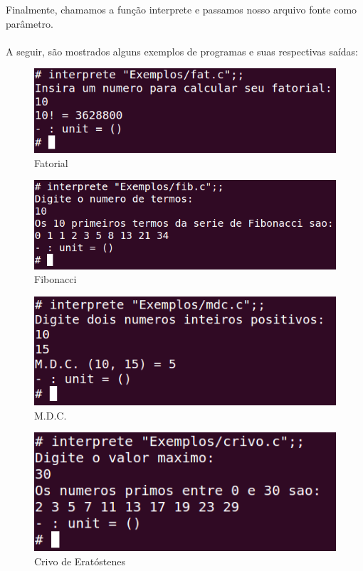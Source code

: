 \documentclass[12pt,a4paper,twoside]{report}
\begin{document}
Finalmente, chamamos a função interprete e passamos nosso arquivo fonte como parâmetro.\\\\

A seguir, são mostrados alguns exemplos de programas e suas respectivas saídas:

\begin{figure}[!h]
\centering
\caption{Fatorial} \label{fig:fatorial}
\includegraphics[scale=0.5]{imagens/fat.png}
\end{figure}

\begin{figure}[!h]
\centering
\caption{Fibonacci} \label{fig:fibonacci}
\includegraphics[scale=0.5]{imagens/fib.png}
\end{figure}

\begin{figure}[!h]
\centering
\caption{M.D.C.} \label{fig:mdc}
\includegraphics[scale=0.5]{imagens/mdc.png}
\end{figure}

\begin{figure}[!h]
\centering
\caption{Crivo de Eratóstenes} \label{fig:fatorial}
\includegraphics[scale=0.5]{imagens/crivo.png}
\end{figure}
\end{document}
